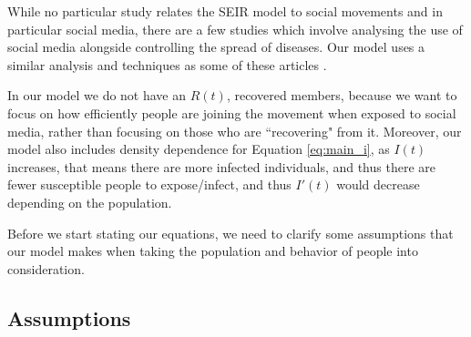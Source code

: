 \documentclass{article}
\begin{document}
    While no particular study relates the SEIR model to social movements and in particular social media, there are a few studies which involve analysing the use of social media alongside controlling the spread of diseases. Our model uses a similar analysis and techniques as some of these articles \cite{du_how_2021}\cite{choi_effects_2017}.
    
    In our model we do not have an $R(t)$, recovered members, because we want to focus on how efficiently people are joining the movement when exposed to social media, rather than focusing on those who are ``recovering" from it. Moreover, our model also includes density dependence for Equation \ref{eq:main_i}, as $I(t)$ increases, that means there are more infected individuals, and thus there are fewer susceptible people to expose/infect, and thus $I'(t)$ would decrease depending on the population.
    
    Before we start stating our equations, we need to clarify some assumptions that our model makes when taking the population and behavior of people into consideration.

    \subsection{Assumptions}
    
\end{document}
